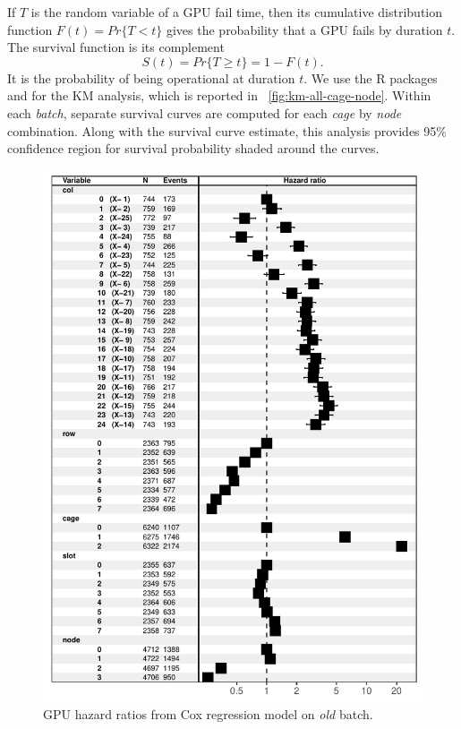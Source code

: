 If $T$ is the random variable of a GPU fail time, then its cumulative
distribution function $F(t) = Pr\{T < t\}$ gives the probability that
a GPU fails by duration $t$. The survival function is its complement
\begin{displaymath}
  S(t) = Pr\{T \geq t\} = 1 - F(t).
\end{displaymath}
It is the probability of being operational at duration $t$.  We use
the R packages  \cite{survival-package} and
 \cite{survminer-package} for the KM analysis, which is
reported in ~\ref{fig:km-all-cage-node}. Within each {\em
  batch}, separate survival curves are computed for each {\em cage} by
{\em node} combination. Along with the survival curve estimate, this
analysis provides 95\% confidence region for survival probability
shaded around the curves.
\begin{figure}[bt]
  \centering
  \includegraphics[width=\columnwidth]{figs/cox_o001.pdf}
  \caption{GPU hazard ratios from Cox regression model on {\em old}
    batch. }
  \label{fig:cox-old}
\end{figure}
